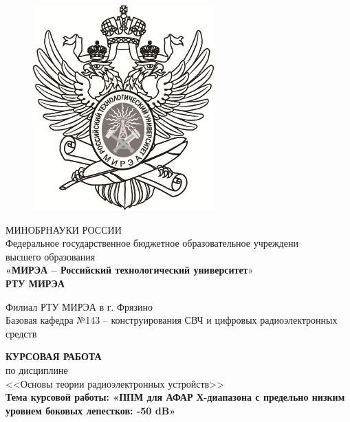 \thispagestyle{empty}

\begin{center}
\begin{spacing}{1}

\begin{figure}[H]
    \centering
    \includegraphics{images/titul/1.png} %
\end{figure}


        \small МИНОБРНАУКИ РОССИИ\\
        \small Федеральное государственное бюджетное образовательное учреждени\\
        \small высшего образования\\
        \small \textbf{«МИРЭА – Российский технологический университет}»\\
        \Large\textbf{РТУ МИРЭА}
        \vspace{0cm}
        



        \normalsize  Филиал РТУ МИРЭА в г. Фрязино\\
        \normalsize Базовая кафедра №143 – конструирования СВЧ и цифровых радиоэлектронных средств\\
        
        \vspace{0.5cm} 
        
        \Large\textbf{КУРСОВАЯ РАБОТА}\\
        \normalsize по дисциплине\\
        \normalsize <<Основы теории радиоэлектронных устройств>>\\
        \textbf{Тема курсовой работы: «ППМ для АФАР Х-диапазона с предельно низким уровнем боковых лепестков: -50 dB»}


\end{spacing}
\end{center}

